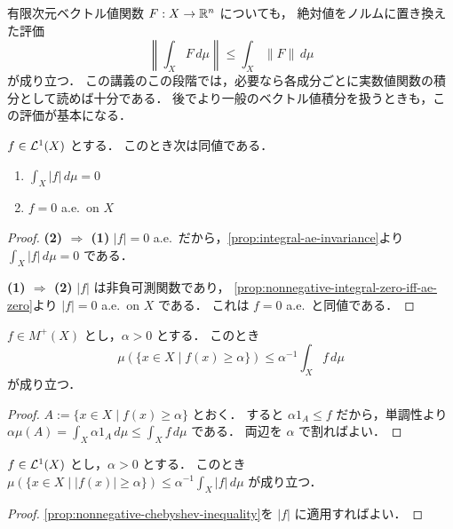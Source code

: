 \begin{remark}[ベクトル値の場合]
有限次元ベクトル値関数 $F:X\to\mathbb R^n$ についても，
絶対値をノルムに置き換えた評価
\[
\left\|\int_X F\,d\mu\right\|
\le \int_X \|F\|\,d\mu
\]
が成り立つ．
この講義のこの段階では，必要なら各成分ごとに実数値関数の積分として読めば十分である．
後でより一般のベクトル値積分を扱うときも，この評価が基本になる．
\end{remark}

\begin{proposition}\label{prop:integral-zero-iff-ae-zero}
$f\in\mathcal L^1(X)$ とする．
このとき次は同値である．
\begin{enumerate}
    \item $\int_X |f|\,d\mu=0$
    \item $f=0$ a.e.\ on $X$
\end{enumerate}
\end{proposition}
\begin{proof}
\textbf{(2) $\Rightarrow$ (1)}\quad
$|f|=0$ a.e.\ だから，\cref{prop:integral-ae-invariance}より $\int_X |f|\,d\mu=0$ である．

\textbf{(1) $\Rightarrow$ (2)}\quad
$|f|$ は非負可測関数であり，
\cref{prop:nonnegative-integral-zero-iff-ae-zero}より $|f|=0$ a.e.\ on $X$ である．
これは $f=0$ a.e.\ と同値である．
\end{proof}

\begin{proposition}[非負関数のChebyshev不等式]\label{prop:nonnegative-chebyshev-inequality}
$f\in M^+(X)$ とし，$\alpha>0$ とする．
このとき
\[
\mu(\{x\in X\mid f(x)\ge \alpha\})
\le \alpha^{-1}\int_X f\,d\mu
\]
が成り立つ．
\end{proposition}
\begin{proof}
$A:=\{x\in X\mid f(x)\ge \alpha\}$ とおく．
すると $\alpha 1_A\le f$ だから，単調性より
$\alpha\mu(A)=\int_X \alpha1_A\,d\mu\le \int_X f\,d\mu$ である．
両辺を $\alpha$ で割ればよい．
\end{proof}

\begin{corollary}[Chebyshev不等式]\label{prop:chebyshev-inequality}
$f\in\mathcal L^1(X)$ とし，$\alpha>0$ とする．
このとき $\mu(\{x \in X \mid |f(x)|\ge \alpha\})\le \alpha^{-1}\int_X |f|\,d\mu$ が成り立つ．
\end{corollary}
\begin{proof}
\cref{prop:nonnegative-chebyshev-inequality}を $|f|$ に適用すればよい．
\end{proof}

